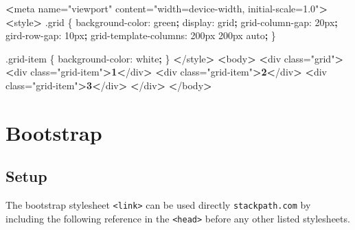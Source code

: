 \documentclass[]{book}
\newenvironment{Shaded}{\begin{snugshade}}{\end{snugshade}}
\newcommand{\ExtensionTok}[1]{#1}
\newcommand{\KeywordTok}[1]{\textcolor[rgb]{0.13,0.29,0.53}{\textbf{#1}}}
\newcommand{\NormalTok}[1]{#1}
\newcommand{\OperatorTok}[1]{\textcolor[rgb]{0.81,0.36,0.00}{\textbf{#1}}}
\newcommand{\StringTok}[1]{\textcolor[rgb]{0.31,0.60,0.02}{#1}}
\begin{document}
\begin{Shaded}
\begin{Highlighting}[]
\OperatorTok{<}\ExtensionTok{meta}\NormalTok{ name=}\StringTok{"viewport"}\NormalTok{ content=}\StringTok{"width=device-width, initial-scale=1.0"}\OperatorTok{>}
\OperatorTok{<}\ExtensionTok{style}\OperatorTok{>}
    \ExtensionTok{.grid}\NormalTok{ \{}
        \ExtensionTok{background-color}\NormalTok{: green}\KeywordTok{;}
        \ExtensionTok{display}\NormalTok{: grid}\KeywordTok{;}
        \ExtensionTok{grid-column-gap}\NormalTok{: 20px}\KeywordTok{;}
        \ExtensionTok{gird-row-gap}\NormalTok{: 10px}\KeywordTok{;}
        \ExtensionTok{grid-template-columns}\NormalTok{: 200px 200px auto}\KeywordTok{;}
\NormalTok{    \}}

    \ExtensionTok{.grid-item}\NormalTok{ \{}
        \ExtensionTok{background-color}\NormalTok{: white}\KeywordTok{;}
\NormalTok{    \}}
\OperatorTok{<}\NormalTok{/}\ExtensionTok{style}\OperatorTok{>}
\OperatorTok{<}\ExtensionTok{body}\OperatorTok{>}
    \OperatorTok{<}\ExtensionTok{div}\NormalTok{ class=}\StringTok{"grid"}\OperatorTok{>}
        \OperatorTok{<}\ExtensionTok{div}\NormalTok{ class=}\StringTok{"grid-item"}\OperatorTok{>1<}\NormalTok{/div}\OperatorTok{>}
        \OperatorTok{<}\ExtensionTok{div}\NormalTok{ class=}\StringTok{"grid-item"}\OperatorTok{>2<}\NormalTok{/div}\OperatorTok{>}
        \OperatorTok{<}\ExtensionTok{div}\NormalTok{ class=}\StringTok{"grid-item"}\OperatorTok{>3<}\NormalTok{/div}\OperatorTok{>}
    \OperatorTok{<}\NormalTok{/}\ExtensionTok{div}\OperatorTok{>}
\OperatorTok{<}\NormalTok{/}\ExtensionTok{body}\OperatorTok{>}
\end{Highlighting}
\end{Shaded}

\hypertarget{bootstrap}{%
\chapter{Bootstrap}\label{bootstrap}}

\hypertarget{setup}{%
\section{Setup}\label{setup}}

The bootstrap stylesheet \texttt{\textless{}link\textgreater{}} can be used directly \texttt{stackpath.com} by including the following reference in the \texttt{\textless{}head\textgreater{}} before any other listed stylesheets.
\end{document}
